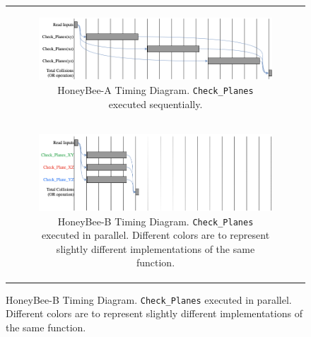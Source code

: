 \begin{figure}[H]
\begin{centering}
\begin{tabular}{c}

\begin{subfigure}{0.97\textwidth}
\includegraphics[width=\linewidth]{chapters/chapter3/img/timing1.png}
\caption{HoneyBee-A Timing Diagram. \texttt{Check\_Planes} executed sequentially.}
\label{fig:hbb_timing_a}
\end{subfigure} \\

\begin{subfigure}{0.97\textwidth}
\includegraphics[width=\linewidth]{chapters/chapter3/img/timing2.png}
\caption{HoneyBee-B Timing Diagram. \texttt{Check\_Planes} executed in parallel. Different colors are to represent slightly different implementations of the same function.}
\label{fig:hbb_timing_b}
\end{subfigure} \\

\end{tabular}
\label{fig:hbb_timing}
\end{centering}
\end{figure}
